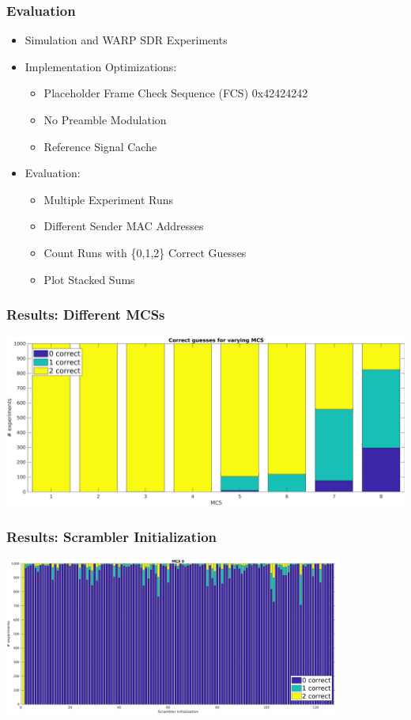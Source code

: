 \documentclass[accentcolor=tud8b,colorbacktitle]{tudbeamer}
\begin{document}
\begin{frame}
\frametitle{Evaluation}
\begin{itemize}
	\setlength\itemsep{1em}
	\item Simulation and WARP SDR Experiments
	\item Implementation Optimizations:
	\begin{itemize}
		\item Placeholder Frame Check Sequence (FCS) 0x42424242
		\item No Preamble Modulation
		\item Reference Signal Cache
	\end{itemize}
	\item Evaluation:
	\begin{itemize}
		\item Multiple Experiment Runs
		\item Different Sender MAC Addresses
		\item Count Runs with \{0,1,2\} Correct Guesses
		\item Plot Stacked Sums
	\end{itemize}
\end{itemize}
\end{frame}


\begin{frame}
\frametitle{Results: Different MCSs}
\begin{centering}
	\includegraphics[width=\textwidth]{../../gfx/plots/mcs}\\
\end{centering}
\end{frame}


\begin{frame}
\frametitle{Results: Scrambler Initialization}
\begin{centering}
	\includegraphics[width=11cm]{../../gfx/plots/scrambler}\\
\end{centering}
\end{frame}
\end{document}
